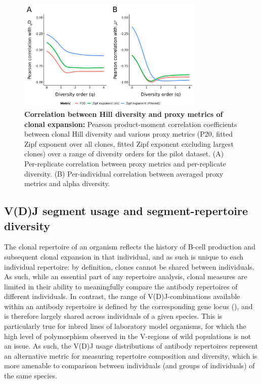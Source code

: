 \begin{figure}
\centering
\begin{subfigure}{0em}
\label{fig:igseq-pilot-clone-diversity-metrics-cor-rep}
\end{subfigure}
\begin{subfigure}{0em}
\label{fig:igseq-pilot-clone-diversity-metrics-cor-alpha}
\end{subfigure}
\includegraphics[width = 0.8\textwidth]{_Figures/png/pilot-clone-diversity-metrics-cor}
\caption[Correlation between Hill diversity and proxy metrics of clonal expansion]{\textbf{Correlation between Hill diversity and proxy metrics of clonal expansion:}
Pearson product-moment correlation coefficients between clonal Hill diversity and various proxy metrics (P20, fitted Zipf exponent over all clones, fitted Zipf exponent excluding largest clones) over a range of diversity orders for the \igseq pilot dataset. (A) Per-replicate correlation between proxy metrics and per-replicate diversity. (B) Per-individual correlation between averaged proxy metrics and alpha diversity.}
\label{fig:igseq-pilot-clone-diversity-metrics-cor}
\end{figure}


\subsection{V(D)J segment usage and segment-repertoire diversity}
\label{sec:igseq_pilot_segments}

The clonal repertoire of an organism reflects the history of \naive B-cell production and subsequent clonal expansion in that individual, and as such is unique to each individual repertoire: by definition, clones cannot be shared between individuals. As such, while an essential part of any repertoire analysis, clonal measures are limited in their ability to meaningfully compare the antibody repertoires of different individuals. In contrast, the range of V(D)J-combinations available within an antibody repertoire is defined by the corresponding gene locus (), and is therefore largely shared across individuals of a given species. This is particularly true for inbred lines of laboratory model organisms, for which the high level of polymorphism observed in the V-regions of wild populations \parencite{gadalamaria2015tigger,corcoran2016igdiscover} is not an issue. As such, the V(D)J usage distributions of antibody repertoires represent an alternative metric for measuring repertoire composition and diversity, which is more amenable to comparison between individuals (and groups of individuals) of the same species.

